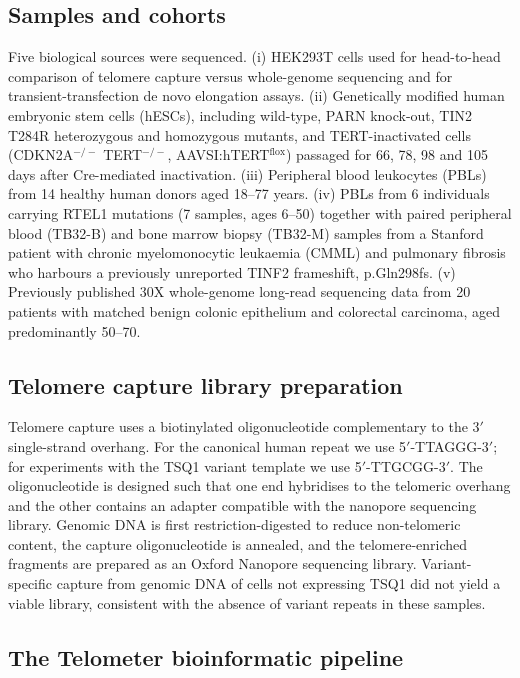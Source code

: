 \documentclass[11pt]{article}
\begin{document}
\subsection{Samples and cohorts}

Five biological sources were sequenced. (i) HEK293T cells used for
head-to-head comparison of telomere capture versus whole-genome
sequencing and for transient-transfection de novo elongation assays.
(ii) Genetically modified human embryonic stem cells (hESCs), including
wild-type, PARN knock-out, TIN2 T284R heterozygous and homozygous
mutants, and TERT-inactivated cells (CDKN2A$^{-/-}$ TERT$^{-/-}$,
AAVSI:hTERT$^{\text{flox}}$) passaged for 66, 78, 98 and 105 days after
Cre-mediated inactivation. (iii) Peripheral blood leukocytes (PBLs) from
14 healthy human donors aged 18--77 years. (iv) PBLs from 6 individuals
carrying RTEL1 mutations (7 samples, ages 6--50) together with paired
peripheral blood (TB32-B) and bone marrow biopsy (TB32-M) samples from a
Stanford patient with chronic myelomonocytic leukaemia (CMML) and
pulmonary fibrosis who harbours a previously unreported TINF2
frameshift, p.Gln298fs. (v) Previously published 30X whole-genome
long-read sequencing data from 20 patients with matched benign colonic
epithelium and colorectal carcinoma, aged predominantly 50--70.

\subsection{Telomere capture library preparation}

Telomere capture uses a biotinylated oligonucleotide complementary to the
3$'$ single-strand overhang. For the canonical human repeat we use
5$'$-TTAGGG-3$'$; for experiments with the TSQ1 variant template we use
5$'$-TTGCGG-3$'$. The oligonucleotide is designed such that one end
hybridises to the telomeric overhang and the other contains an adapter
compatible with the nanopore sequencing library. Genomic DNA is first
restriction-digested to reduce non-telomeric content, the capture
oligonucleotide is annealed, and the telomere-enriched fragments are
prepared as an Oxford Nanopore sequencing library. Variant-specific
capture from genomic DNA of cells not expressing TSQ1 did not yield a
viable library, consistent with the absence of variant repeats in these
samples.

\subsection{The Telometer bioinformatic pipeline}
\end{document}
